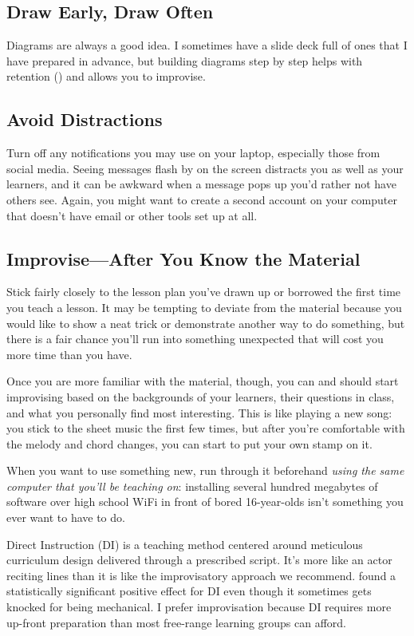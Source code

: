\subsection*{Draw Early, Draw Often}

Diagrams are always a good idea.
I sometimes have a slide deck full of ones that I have prepared in advance,
but building diagrams step by step helps with retention ()
and allows you to improvise.

\subsection*{Avoid Distractions}

Turn off any notifications you may use on your laptop,
especially those from social media.
Seeing messages flash by on the screen distracts you as well as your learners,
and it can be awkward when a message pops up you'd rather not have others see.
Again,
you might want to create a second account on your computer
that doesn't have email or other tools set up at all.

\subsection*{Improvise---After You Know the Material}

Stick fairly closely to the lesson plan you've drawn up or borrowed
the first time you teach a lesson.
It may be tempting to deviate from the material
because you would like to show a neat trick or demonstrate another way to do something,
but there is a fair chance you'll run into something unexpected
that will cost you more time than you have.

Once you are more familiar with the material,
though,
you can and should start improvising based on the backgrounds of your learners,
their questions in class,
and what you personally find most interesting.
This is like playing a new song:
you stick to the sheet music the first few times,
but after you're comfortable with the melody and chord changes,
you can start to put your own stamp on it.

When you want to use something new,
run through it beforehand
\emph{using the same computer that you'll be teaching on}:
installing several hundred megabytes of software over high school WiFi
in front of bored 16-year-olds isn't something you ever want to have to do.

\begin{aside}{Direct Instruction}
   (DI) is a teaching method
  centered around meticulous curriculum design delivered through a prescribed script.
  It's more like an actor reciting lines than it is like the improvisatory approach we recommend.
  \cite{Stoc2018} found a statistically significant positive effect for DI
  even though it sometimes gets knocked for being mechanical.
  I prefer improvisation because DI requires more up-front preparation
  than most free-range learning groups can afford.
\end{aside}

